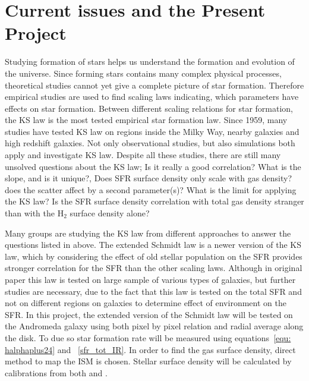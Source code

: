\section{Current issues and the Present Project}
\label{chap:mp}
Studying formation of stars helps us understand the formation and evolution of the universe. Since forming stars contains many complex physical processes, theoretical studies cannot yet give a complete picture of star formation. Therefore empirical studies are used to find scaling laws indicating, which parameters have effects on star formation. Between different scaling relations for star formation, the KS law is the most tested empirical star formation law. Since 1959, many studies have tested KS law on regions inside the Milky Way, nearby galaxies and high redshift galaxies. Not only observational studies, but also  simulations both apply and investigate KS law. Despite all these studies, there are still many unsolved questions about the KS law; Is it really a good correlation? What is the slope, and is it unique?, Does SFR surface density only scale with gas density? does the scatter affect by a second parameter(s)? What is the limit for applying the KS law? Is the SFR surface density correlation with total gas density stranger than with the H$_2$ surface density alone?

Many groups are studying the KS law from different approaches to answer the questions listed in above. The extended Schmidt law is a newer version of the KS law, which by considering the effect of old stellar population on the SFR provides stronger correlation for the SFR than the other scaling laws. Although in original paper this law is tested on large sample of various types of galaxies, but further studies are necessary, due to the fact that this law is tested on the total SFR and not on different regions on galaxies to determine effect of environment on the SFR. In this project, the extended version of the Schmidt law will be tested on the Andromeda galaxy using both pixel by pixel relation and radial average along the disk. To due so star formation rate will be measured using equations~\ref{equ: halphaplus24} and ~\ref{sfr_tot_IR}. In order to find the gas surface density, direct method to map the ISM is chosen. Stellar surface density will be calculated by calibrations from both \cite{Eskew12} and \cite{Zhu10}.

